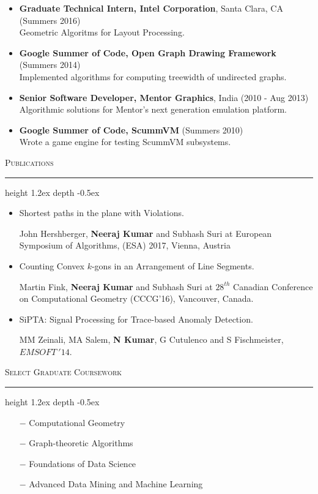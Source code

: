 \documentclass[11pt]{article}
\def\Vhrulefill{\leavevmode\leaders\hrule height 1.2ex depth \dimexpr2pt-0.5ex\hfill\kern0pt}
\begin{document}
{\begin{itemize}
	\item \textbf{Graduate Technical Intern, Intel Corporation}, Santa Clara, CA \hfill(Summers 2016) \\
        Geometric Algoritms for Layout Processing.
	
    \item \textbf{Google Summer of Code, Open Graph Drawing Framework} \hfill(Summers 2014) \\
		Implemented algorithms for computing treewidth of undirected graphs.

	\item \textbf{Senior Software Developer, Mentor Graphics}, India \hfill(2010 - Aug 2013) \\
		Algorithmic solutions for Mentor's next generation emulation platform.
	
	\item \textbf{Google Summer of Code, ScummVM} \hfill(Summers 2010) \\
		Wrote a game engine for testing ScummVM subsystems.
\end{itemize}

\medskip
\noindent\textsc{Publications}
\textcolor{mygray}{\noindent\Vhrulefill}
\begin{itemize}
    \item Shortest paths in the plane with Violations.

        John Hershberger, \textbf{Neeraj Kumar} and Subhash Suri at
        European Symposium of Algorithms, (ESA) 2017, Vienna, Austria


    \item Counting Convex $k$-gons in an Arrangement of Line Segments. 
    
        Martin Fink, \textbf{Neeraj Kumar} and Subhash Suri at
        $28^{th}$ Canadian Conference on Computational Geometry (CCCG'16), Vancouver, Canada.

    \item SiPTA: Signal Processing for Trace-based Anomaly Detection.

        MM Zeinali, MA Salem, \textbf{N Kumar}, G Cutulenco and S Fischmeister, $EMSOFT~'14$.
\end{itemize}

\noindent\textsc{Select Graduate Coursework}
\textcolor{mygray}{\noindent\Vhrulefill}
\medskip
\begin{itemize}
    \item[$-$] Computational Geometry
    \item[$-$] Graph-theoretic Algorithms
    \item[$-$] Foundations of Data Science
    \item[$-$] Advanced Data Mining and Machine Learning
\end{itemize}

}
\end{document}
